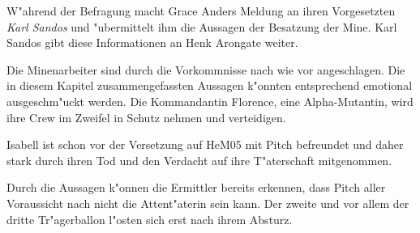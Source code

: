 W"ahrend der Befragung macht Grace Anders Meldung an ihren Vorgesetzten \emph{Karl Sandos} und "ubermittelt ihm die Aussagen der Besatzung der Mine. Karl Sandos gibt diese Informationen an Henk Arongate weiter.

\begin{remarks}
	Die Minenarbeiter sind durch die Vorkommnisse nach wie vor angeschlagen. Die in diesem Kapitel zusammengefassten Aussagen k"onnten entsprechend emotional ausgeschm"uckt werden. Die Kommandantin Florence, eine Alpha-Mutantin, wird ihre Crew im Zweifel in Schutz nehmen und verteidigen.

	Isabell ist schon vor der Versetzung auf HeM05 mit Pitch befreundet und daher stark durch ihren Tod und den Verdacht auf ihre T"aterschaft mitgenommen.
	
	Durch die Aussagen k"onnen die Ermittler bereits erkennen, dass Pitch aller Voraussicht nach nicht die Attent"aterin sein kann. Der zweite und vor allem der dritte Tr"agerballon l"osten sich erst nach ihrem Absturz.
\end{remarks}
